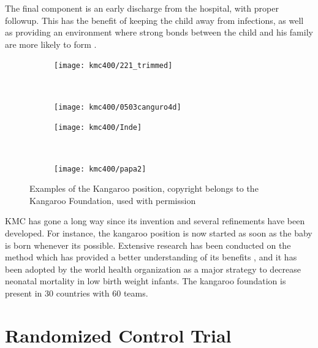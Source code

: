 The final component is an early discharge from the hospital, with proper followup. This has the benefit of keeping the child away from infections, as well as providing an environment where strong bonds between the child and his family are more likely to form \autocite{charpak_kangaroo_2005}. 

\begin{figure}
    \centering
    \begin{subfigure}{0.45\textwidth}
        \texttt{[image: kmc400/221\_trimmed]}
    \end{subfigure} ~
    \begin{subfigure}{0.45\textwidth}
        \texttt{[image: kmc400/0503canguro4d]}
    \end{subfigure}
		\par \bigskip
		\begin{subfigure}{0.45\textwidth}
        \texttt{[image: kmc400/Inde]}
    \end{subfigure} ~
		    \begin{subfigure}{0.45\textwidth}
        \texttt{[image: kmc400/papa2]}
    \end{subfigure}
    \caption{Examples of the Kangaroo position, copyright belongs to the Kangaroo Foundation, used with permission}\label{fig_kmc_position}
\end{figure}

KMC has gone a long way since its invention \autocite{charpak_kmc_2011} and several refinements have been developed. For instance, the kangaroo position is now started as soon as the baby is born whenever its possible. Extensive research has been conducted on the method which has provided a better understanding of its benefits \autocite{the_cochrane_collaboration_kangaroo_2014}, and it  has been adopted by the world health organization as a major strategy to decrease neonatal mortality in low birth weight infants. The kangaroo foundation is present in 30 countries with 60 teams. 


\section{Randomized Control Trial}

